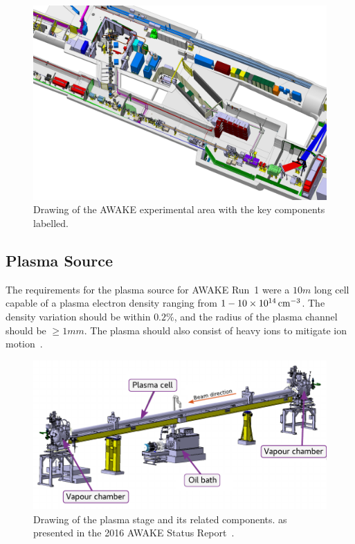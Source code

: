 \begin{figure}[hbt]
    \centering
    \includegraphics[width=0.99\linewidth,trim={0mm 0mm 0mm 0mm},clip]{figures/AwakeExperiment}
    \caption{\label{Fig:WFA:AWAKE}
        Drawing of the AWAKE experimental area with the key components labelled.
    }
\end{figure}

\subsection{Plasma Source}
\label{WFA:Design:Plasma}

The requirements for the plasma source for AWAKE Run~1 were a $10\unit{m}$ long cell capable of a plasma electron density ranging from $1-10\times 10^{14}\,\mathrm{cm}^{-3}$.
The density variation should be within $0.2\%$, and the radius of the plasma channel should be $\geq 1\unit{mm}$.
The plasma should also consist of heavy ions to mitigate ion motion~\cite{caldwell:2015}.

\begin{figure}[hbt]
    \centering
    \includegraphics[width=0.70\linewidth,trim={0mm 0mm 0mm 0mm},clip]{figures/PlasmaCell}
    \caption{\label{Fig:WFA:PlasmaCell}
        Drawing of the plasma stage and its related components. as presented in the 2016 AWAKE Status Report~\cite{awake_collaboration:2016}.
    }
\end{figure}

